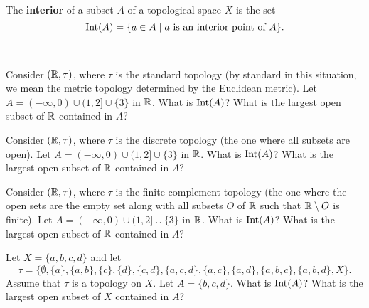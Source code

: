 \begin{definition} The \textbf{interior} of a subset $A$ of a topological space $X$ is the set
\[\text{Int}(A) = \{a \in A \mid a \text{ is an interior point of } A\}.\]
\end{definition}

\begin{activity} \label{act:interior} ~
\ba
\item Consider $(\mathbb{R}, \tau)$, where $\tau$ is the standard topology (by standard in this situation, we mean the metric topology determined by the Euclidean metric). Let $A=(-\infty,0)\cup (1,2]\cup \{3\}$ in $\mathbb{R}$. What is $\text{Int}(A)$? What is the largest open subset of $\mathbb{R}$ contained in $A$?

\item Consider $(\mathbb{R}, \tau)$, where $\tau$ is the discrete topology (the one where all subsets are open). Let $A=(-\infty,0) \cup (1,2] \cup \{3\}$ in $\mathbb{R}$. What is $\text{Int}(A)$? What is the largest open subset of $\mathbb{R}$ contained in $A$?

\item Consider $(\mathbb{R}, \tau)$, where $\tau$ is the finite complement topology (the one where the open sets are the empty set along with all subsets $O$ of $\mathbb{R}$ such that $\mathbb{R} \setminus O$ is finite). Let $A=(-\infty,0) \cup (1,2] \cup \{3\}$ in $\mathbb{R}$. What is $\text{Int}(A)$? What is the largest open subset of $\mathbb{R}$ contained in $A$?

\item Let $X = \{a,b,c,d\}$ and let 
\[\tau = \{\emptyset, \{a\}, \{a,b\}, \{c\}, \{d\}, \{c,d\}, \{a,c,d\}, \{a,c\}, \{a,d\}, \{a,b,c\}, \{a,b,d\}, X\}.\]
Assume that $\tau$ is a topology on $X$. Let $A = \{b,c,d\}$. What is $\text{Int}(A)$? What is the largest open subset of $X$ contained in $A$?

\ea

\end{activity}

